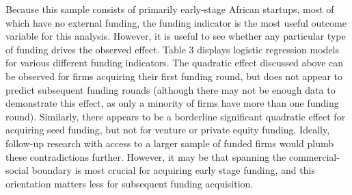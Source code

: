 \documentclass[12pt]{article}
\begin{document}
\clearpage

Because this sample consists of primarily early-stage African startups, most of which have no external funding, the funding indicator is the most useful outcome variable for this analysis. However, it is useful to see whether any particular type of funding drives the observed effect. Table 3 displays logistic regression models for various different funding indicators. The quadratic effect discussed above can be observed for firms acquiring their first funding round, but does not appear to predict subsequent funding rounds (although there may not be enough data to demonstrate this effect, as only a minority of firms have more than one funding round). Similarly, there appears to be a borderline significant quadratic effect for acquiring seed funding, but not for venture or private equity funding. Ideally, follow-up research with access to a larger sample of funded firms would plumb these contradictions further. However, it may be that spanning the commercial-social boundary is most crucial for acquiring early stage funding, and this orientation matters less for subsequent funding acquisition. 
\end{document}
